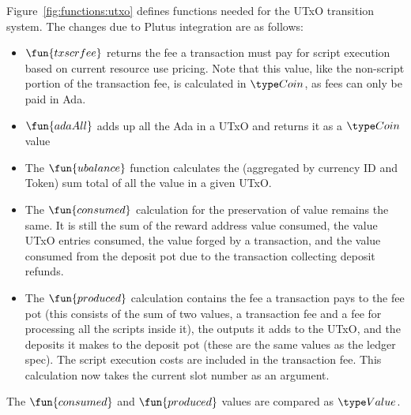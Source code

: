 Figure~\ref{fig:functions:utxo} defines functions needed for the UTxO transition system.
The changes due to Plutus integration are as follows:

\begin{itemize}
  \item $\fun{txscrfee}$ returns the fee a transaction must pay for script
  execution based on current resource use pricing. Note that this value,
  like the non-script portion of the transaction fee, is calculated in $\Coin$,
  as fees can only be paid in Ada.

  \item $\fun{adaAll}$ adds up all the Ada in a UTxO and returns it as a
  $\Coin$ value

  \item
    The $\fun{ubalance}$ function calculates the (aggregated by currency ID and
    Token) sum total of all the value in a given UTxO.

  \item The $\fun{consumed}$ calculation for the preservation of value remains the
  same. It is still the sum of the reward address value consumed, the value
   UTxO entries consumed, the value forged by a transaction,
   and the value consumed from the deposit pot due
   to the transaction collecting deposit refunds.

  \item The $\fun{produced}$ calculation contains the fee a transaction pays
  to the fee pot (this consists of the sum of two values, a transaction fee and a
  fee for processing all the scripts inside it), the outputs it adds to the UTxO,
  and the deposits it makes
  to the deposit pot (these are the same values as the ledger spec).
  The script execution costs are included in the transaction fee.
  This calculation now takes the current slot number as an argument.
\end{itemize}

The $\fun{consumed}$ and $\fun{produced}$ values are compared as $\Value$.

